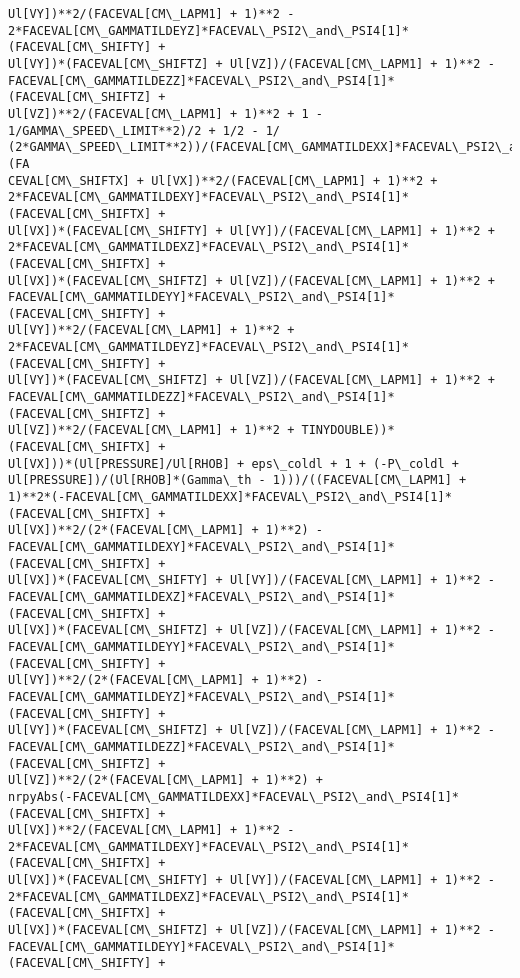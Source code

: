 \documentclass[landscape,letterpaper,10pt,english]{article}
\begin{document}
\begin{Verbatim}[commandchars=\\\{\}]
Ul[VY])**2/(FACEVAL[CM\_LAPM1] + 1)**2 -
2*FACEVAL[CM\_GAMMATILDEYZ]*FACEVAL\_PSI2\_and\_PSI4[1]*(FACEVAL[CM\_SHIFTY] +
Ul[VY])*(FACEVAL[CM\_SHIFTZ] + Ul[VZ])/(FACEVAL[CM\_LAPM1] + 1)**2 -
FACEVAL[CM\_GAMMATILDEZZ]*FACEVAL\_PSI2\_and\_PSI4[1]*(FACEVAL[CM\_SHIFTZ] +
Ul[VZ])**2/(FACEVAL[CM\_LAPM1] + 1)**2 + 1 - 1/GAMMA\_SPEED\_LIMIT**2)/2 + 1/2 - 1/
(2*GAMMA\_SPEED\_LIMIT**2))/(FACEVAL[CM\_GAMMATILDEXX]*FACEVAL\_PSI2\_and\_PSI4[1]*(FA
CEVAL[CM\_SHIFTX] + Ul[VX])**2/(FACEVAL[CM\_LAPM1] + 1)**2 +
2*FACEVAL[CM\_GAMMATILDEXY]*FACEVAL\_PSI2\_and\_PSI4[1]*(FACEVAL[CM\_SHIFTX] +
Ul[VX])*(FACEVAL[CM\_SHIFTY] + Ul[VY])/(FACEVAL[CM\_LAPM1] + 1)**2 +
2*FACEVAL[CM\_GAMMATILDEXZ]*FACEVAL\_PSI2\_and\_PSI4[1]*(FACEVAL[CM\_SHIFTX] +
Ul[VX])*(FACEVAL[CM\_SHIFTZ] + Ul[VZ])/(FACEVAL[CM\_LAPM1] + 1)**2 +
FACEVAL[CM\_GAMMATILDEYY]*FACEVAL\_PSI2\_and\_PSI4[1]*(FACEVAL[CM\_SHIFTY] +
Ul[VY])**2/(FACEVAL[CM\_LAPM1] + 1)**2 +
2*FACEVAL[CM\_GAMMATILDEYZ]*FACEVAL\_PSI2\_and\_PSI4[1]*(FACEVAL[CM\_SHIFTY] +
Ul[VY])*(FACEVAL[CM\_SHIFTZ] + Ul[VZ])/(FACEVAL[CM\_LAPM1] + 1)**2 +
FACEVAL[CM\_GAMMATILDEZZ]*FACEVAL\_PSI2\_and\_PSI4[1]*(FACEVAL[CM\_SHIFTZ] +
Ul[VZ])**2/(FACEVAL[CM\_LAPM1] + 1)**2 + TINYDOUBLE))*(FACEVAL[CM\_SHIFTX] +
Ul[VX]))*(Ul[PRESSURE]/Ul[RHOB] + eps\_coldl + 1 + (-P\_coldl +
Ul[PRESSURE])/(Ul[RHOB]*(Gamma\_th - 1)))/((FACEVAL[CM\_LAPM1] +
1)**2*(-FACEVAL[CM\_GAMMATILDEXX]*FACEVAL\_PSI2\_and\_PSI4[1]*(FACEVAL[CM\_SHIFTX] +
Ul[VX])**2/(2*(FACEVAL[CM\_LAPM1] + 1)**2) -
FACEVAL[CM\_GAMMATILDEXY]*FACEVAL\_PSI2\_and\_PSI4[1]*(FACEVAL[CM\_SHIFTX] +
Ul[VX])*(FACEVAL[CM\_SHIFTY] + Ul[VY])/(FACEVAL[CM\_LAPM1] + 1)**2 -
FACEVAL[CM\_GAMMATILDEXZ]*FACEVAL\_PSI2\_and\_PSI4[1]*(FACEVAL[CM\_SHIFTX] +
Ul[VX])*(FACEVAL[CM\_SHIFTZ] + Ul[VZ])/(FACEVAL[CM\_LAPM1] + 1)**2 -
FACEVAL[CM\_GAMMATILDEYY]*FACEVAL\_PSI2\_and\_PSI4[1]*(FACEVAL[CM\_SHIFTY] +
Ul[VY])**2/(2*(FACEVAL[CM\_LAPM1] + 1)**2) -
FACEVAL[CM\_GAMMATILDEYZ]*FACEVAL\_PSI2\_and\_PSI4[1]*(FACEVAL[CM\_SHIFTY] +
Ul[VY])*(FACEVAL[CM\_SHIFTZ] + Ul[VZ])/(FACEVAL[CM\_LAPM1] + 1)**2 -
FACEVAL[CM\_GAMMATILDEZZ]*FACEVAL\_PSI2\_and\_PSI4[1]*(FACEVAL[CM\_SHIFTZ] +
Ul[VZ])**2/(2*(FACEVAL[CM\_LAPM1] + 1)**2) +
nrpyAbs(-FACEVAL[CM\_GAMMATILDEXX]*FACEVAL\_PSI2\_and\_PSI4[1]*(FACEVAL[CM\_SHIFTX] +
Ul[VX])**2/(FACEVAL[CM\_LAPM1] + 1)**2 -
2*FACEVAL[CM\_GAMMATILDEXY]*FACEVAL\_PSI2\_and\_PSI4[1]*(FACEVAL[CM\_SHIFTX] +
Ul[VX])*(FACEVAL[CM\_SHIFTY] + Ul[VY])/(FACEVAL[CM\_LAPM1] + 1)**2 -
2*FACEVAL[CM\_GAMMATILDEXZ]*FACEVAL\_PSI2\_and\_PSI4[1]*(FACEVAL[CM\_SHIFTX] +
Ul[VX])*(FACEVAL[CM\_SHIFTZ] + Ul[VZ])/(FACEVAL[CM\_LAPM1] + 1)**2 -
FACEVAL[CM\_GAMMATILDEYY]*FACEVAL\_PSI2\_and\_PSI4[1]*(FACEVAL[CM\_SHIFTY] +

\end{Verbatim}
\end{document}

